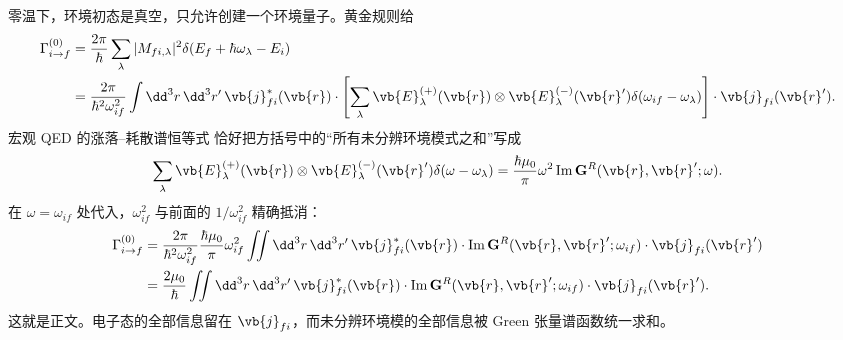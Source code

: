 \begin{derivation}[跃迁电流与环境激发率]
零温下，环境初态是真空，只允许创建一个环境量子。黄金规则给
\begin{align*}
\Gamma_{i\to f}^{(0)}
&=\frac{2\pi}{\hbar}
\sum_\lambda |M_{fi,\lambda}|^2
\delta(E_f+\hbar\omega_\lambda-E_i)\\
&=\frac{2\pi}{\hbar^2\omega_{if}^2}
\int\dd^3 r\,\dd^3 r'\,
\vb{j}_{fi}^*(\vb{r})\cdot
\left[\sum_\lambda
\vb{E}_\lambda^{(+)}(\vb{r})\otimes
\vb{E}_\lambda^{(-)}(\vb{r}')
\delta(\omega_{if}-\omega_\lambda)\right]
\cdot\vb{j}_{fi}(\vb{r}').
\end{align*}
宏观 QED 的涨落--耗散谱恒等式 恰好把方括号中的“所有未分辨环境模式之和”写成
\begin{equation*}
\sum_\lambda
\vb{E}_\lambda^{(+)}(\vb{r})\otimes
\vb{E}_\lambda^{(-)}(\vb{r}')
\delta(\omega-\omega_\lambda)
=\frac{\hbar\mu_0}{\pi}\omega^2
\operatorname{Im}\mathbf G^R(\vb{r},\vb{r}';\omega).
\end{equation*}
在 $\omega=\omega_{if}$ 处代入，$\omega_{if}^2$ 与前面的
$1/\omega_{if}^2$ 精确抵消：
\begin{align*}
\Gamma_{i\to f}^{(0)}
&=\frac{2\pi}{\hbar^2\omega_{if}^2}
\frac{\hbar\mu_0}{\pi}\omega_{if}^2
\iint\dd^3r\,\dd^3r'\,
\vb{j}_{fi}^*(\vb{r})\cdot
\operatorname{Im}\mathbf G^R(\vb{r},\vb{r}';\omega_{if})
\cdot\vb{j}_{fi}(\vb{r}')\\
&={
\frac{2\mu_0}{\hbar}
\iint\dd^3r\,\dd^3r'\,
\vb{j}_{fi}^*(\vb{r})\cdot
\operatorname{Im}\mathbf G^R(\vb{r},\vb{r}';\omega_{if})
\cdot\vb{j}_{fi}(\vb{r}')}.
\end{align*}
这就是正文。电子态的全部信息留在 $\vb{j}_{fi}$，而未分辨环境模的全部信息被 Green 张量谱函数统一求和。
\end{derivation}

